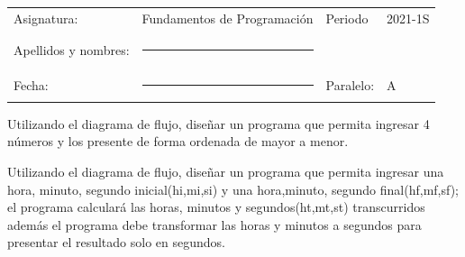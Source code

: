 \documentclass[12pt]{exam}
\begin{document}
\begin{table}[H]
  \centering
  \begin{tabular}[H]{llll}
    Asignatura: & Fundamentos de Programación & Periodo & 2021-1S\\
              &                     &            & \\     
    Apellidos y nombres: &\rule{7cm}{0.4pt}    &  & \\
              &                     &            & \\
    Fecha: &\rule{5cm}{0.4pt}   & Paralelo: & {\Large A} \\
  \end{tabular}
\end{table}




\begin{questions}

\question[25] Utilizando el diagrama de flujo, diseñar un programa que permita ingresar 4 números y los presente de forma ordenada de mayor a menor. 

  \begin{center}
  
  \end{center}

\newpage
\question[25] Utilizando el diagrama de flujo, diseñar un programa  que permita ingresar una hora, minuto, segundo inicial(hi,mi,si) y una hora,minuto, segundo final(hf,mf,sf); el programa calculará las horas, minutos y segundos(ht,mt,st) transcurridos además el programa debe transformar las horas y minutos  a segundos para presentar el resultado solo en segundos. 




\end{questions}
\end{document}
